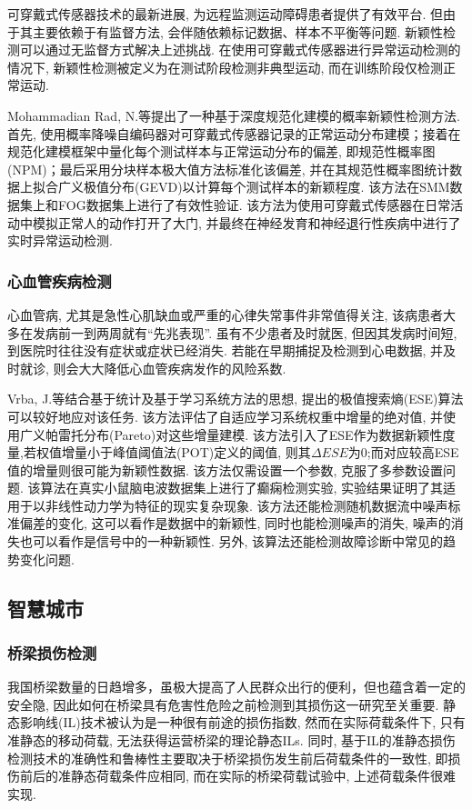 \documentclass{Style/aas}
\begin{document}
\begin{multicols}{2}
  可穿戴式传感器技术的最新进展, 为远程监测运动障碍患者提供了有效平台. 但由于其主要依赖于有监督方法, 会伴随依赖标记数据、样本不平衡等问题. 新颖性检测可以通过无监督方式解决上述挑战. 在使用可穿戴式传感器进行异常运动检测的情况下, 新颖性检测被定义为在测试阶段检测非典型运动, 而在训练阶段仅检测正常运动.

  Mohammadian Rad, N.等\cite{mohammadian2018novelty}提出了一种基于深度规范化建模的概率新颖性检测方法. 首先, 使用概率降噪自编码器对可穿戴式传感器记录的正常运动分布建模；接着在规范化建模框架中量化每个测试样本与正常运动分布的偏差, 即规范性概率图(NPM)；最后采用分块样本极大值方法标准化该偏差, 并在其规范性概率图统计数据上拟合广义极值分布(GEVD)以计算每个测试样本的新颖程度. 该方法在SMM数据集上和FOG数据集上进行了有效性验证. 该方法为使用可穿戴式传感器在日常活动中模拟正常人的动作打开了大门, 并最终在神经发育和神经退行性疾病中进行了实时异常运动检测.


  \subsubsection{心血管疾病检测}
  心血管病, 尤其是急性心肌缺血或严重的心律失常事件非常值得关注, 该病患者大多在发病前一到两周就有“先兆表现”. 虽有不少患者及时就医, 但因其发病时间短, 到医院时往往没有症状或症状已经消失. 若能在早期捕捉及检测到心电数据, 并及时就诊, 则会大大降低心血管疾病发作的风险系数.

  Vrba, J.等\cite{vrba2020introduction}结合基于统计及基于学习系统方法的思想, 提出的极值搜索熵(ESE)算法可以较好地应对该任务. 该方法评估了自适应学习系统权重中增量的绝对值, 并使用广义帕雷托分布(Pareto)对这些增量建模. 该方法引入了ESE作为数据新颖性度量,若权值增量小于峰值阈值法(POT)定义的阈值, 则其$\varDelta ESE $为0;而对应较高ESE值的增量则很可能为新颖性数据. 该方法仅需设置一个参数, 克服了多参数设置问题. 该算法在真实小鼠脑电波数据集上进行了癫痫检测实验, 实验结果证明了其适用于以非线性动力学为特征的现实复杂现象. 该方法还能检测随机数据流中噪声标准偏差的变化, 这可以看作是数据中的新颖性\cite{spangenberg2010detection}, 同时也能检测噪声的消失, 噪声的消失也可以看作是信号中的一种新颖性. 另外, 该算法还能检测故障诊断中常见的趋势变化问题.


  \subsection{智慧城市}
  \subsubsection{桥梁损伤检测}
  我国桥梁数量的日趋增多，虽极大提高了人民群众出行的便利，但也蕴含着一定的安全隐, 因此如何在桥梁具有危害性危险之前检测到其损伤这一研究至关重要. 静态影响线(IL)技术被认为是一种很有前途的损伤指数, 然而在实际荷载条件下, 只有准静态的移动荷载, 无法获得运营桥梁的理论静态ILs. 同时, 基于IL的准静态损伤检测技术的准确性和鲁棒性主要取决于桥梁损伤发生前后荷载条件的一致性\cite{cavadas2013damage}, 即损伤前后的准静态荷载条件应相同, 而在实际的桥梁荷载试验中, 上述荷载条件很难实现.


\end{multicols}
\end{document}
